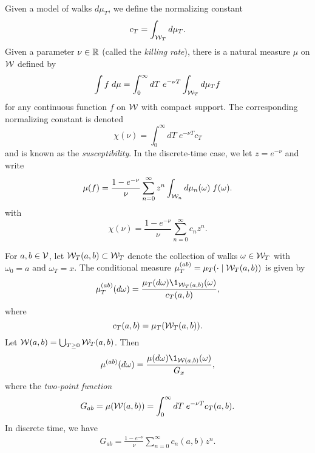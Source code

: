 Given a model of walks $d\mu_T$, we define the normalizing constant
\begin{equation}
c_T = \int_{\mathcal{W}_T} d\mu_T.
\end{equation}
Given a parameter $\nu \in {\mathbb R}$ (called the \emph{killing rate}),
there is a natural measure $\mu$ on $\mathcal{W}$ defined by
\begin{equation}
\int f \; d\mu
  =
\int_0^\infty dT \; e^{-\nu T} \int_{\mathcal{W}_T} d\mu_T f
\end{equation}
for any continuous function $f$ on $\mathcal{W}$ with compact support.
The corresponding normalizing constant is denoted
\begin{equation}
\chi(\nu) = \int_0^\infty dT \; e^{-\nu T} c_T
\end{equation}
and is known as the \emph{susceptibility}. In the discrete-time case,
we let $z = e^{-\nu}$ and write
\begin{equation}
\mu(f)
  =
\frac{1 - e^{-\nu}}{\nu} \sum_{n=0}^\infty z^n \int_{\mathcal{W}_n} d\mu_n(\omega) \; f(\omega).
\end{equation}
with
\begin{equation}
\chi(\nu) = \frac{1 - e^{-\nu}}{\nu} \sum_{n=0}^\infty c_n z^n.
\end{equation}

For $a, b \in \mathcal{V}$, let $\mathcal{W}_T(a, b) \subset \mathcal{W}_T$ denote the collection of walks
$\omega \in \mathcal{W}_T$ with $\omega_0 = a$ and $\omega_T = x$.
The conditional measure $\mu^{(ab)}_T = \mu_T(\cdot \mid \mathcal{W}_T(a, b))$
is given by
\begin{equation}
\mu^{(ab)}_T(d\omega) = \frac{\mu_T(d\omega) \1_{\Wcal_T(a, b)}(\omega)}{c_T(a, b)},
\end{equation}
where
\begin{equation}
c_T(a, b) = \mu_T(\mathcal{W}_T(a, b)).
\end{equation}
Let $\mathcal{W}(a, b) = \bigcup_{T \ge 0} \mathcal{W}_T(a, b)$. Then
\begin{equation}
\mu^{(ab)}(d\omega) = \frac{\mu(d\omega) \1_{\Wcal(a, b)}(\omega)}{G_x},
\end{equation}
where the \emph{two-point function}
\begin{equation}
G_{ab} = \mu(\mathcal{W}(a, b)) = \int_0^\infty dT \; e^{-\nu T} c_T(a, b).
\end{equation}
In discrete time, we have
\begin{align}
G_{ab} = \frac{1 - e^{-\nu}}{\nu} \sum_{n=0}^\infty c_n(a, b) z^n.
\end{align}

